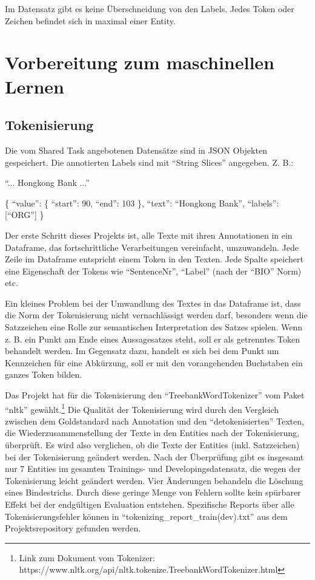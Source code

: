 \documentclass[paper=A4, ngerman, fontsize=12pt]{article}
\begin{document}
	\indent
	Im Datensatz gibt es keine Überschneidung von den Labels. Jedes Token oder Zeichen befindet sich in maximal einer Entity.
	
	\section{Vorbereitung zum maschinellen Lernen}
	
	\subsection{Tokenisierung}
	\noindent
	Die vom Shared Task angebotenen Datensätze sind in JSON Objekten gespeichert. Die annotierten Labels sind mit \enquote{String Slices} angegeben. Z. B.: 
	
	\indent
	 \enquote{... Hongkong Bank ...}
	 
	 \indent
	\{ \enquote{value}: \{ \enquote{start}: 90, \enquote{end}: 103 \}, \enquote{text}: \enquote{Hongkong Bank}, \enquote{labels}: [\enquote{ORG}] \} 
	
	Der erste Schritt dieses Projekts ist, alle Texte mit ihren Annotationen in ein Dataframe, das fortschrittliche Verarbeitungen vereinfacht, umzuwandeln. Jede Zeile im Dataframe entspricht einem Token in den Texten. Jede Spalte speichert eine Eigenschaft der Tokens wie \enquote{SentenceNr}, \enquote{Label} (nach der \enquote{BIO} Norm) etc. 
	
	\indent
	Ein kleines Problem bei der Umwandlung des Textes in das Dataframe ist, dass die Norm der Tokenisierung nicht vernachlässigt werden darf, besonders wenn die Satzzeichen eine Rolle zur semantischen Interpretation des Satzes spielen. Wenn z. B. ein Punkt am Ende eines Aussagesatzes steht, soll er als getrenntes Token behandelt werden. Im Gegensatz dazu, handelt es sich bei dem Punkt um Kennzeichen für eine Abkürzung, soll er mit den vorangehenden Buchstaben ein ganzes Token bilden. 
	
	\indent
	Das Projekt hat für die Tokenisierung den \enquote{TreebankWordTokenizer} vom Paket \enquote{nltk} gewählt.\footnote{Link zum Dokument vom Tokenizer: https://www.nltk.org/api/nltk.tokenize.TreebankWordTokenizer.html} Die Qualität der Tokenisierung wird durch den Vergleich zwischen dem Goldstandard nach Annotation und den \enquote{detokenisierten} Texten, die Wiederzusammenstellung der Texte in den Entities nach der Tokenisierung, überprüft. Es wird also verglichen, ob die Texte der Entities (inkl. Satzzeichen) bei der Tokenisierung geändert werden. Nach der Überprüfung gibt es insgesamt nur 7 Entities im gesamten Trainings- und Developingsdatensatz, die wegen der Tokenisierung leicht geändert werden. Vier Änderungen behandeln die Löschung eines Bindestrichs. Durch diese geringe Menge von Fehlern sollte kein spürbarer Effekt bei der endgültigen Evaluation entstehen. Spezifische Reports über alle Tokenisierungsfehler können in \enquote{tokenizing\_report\_train(dev).txt} aus dem Projektsrepository gefunden werden.
\end{document}
